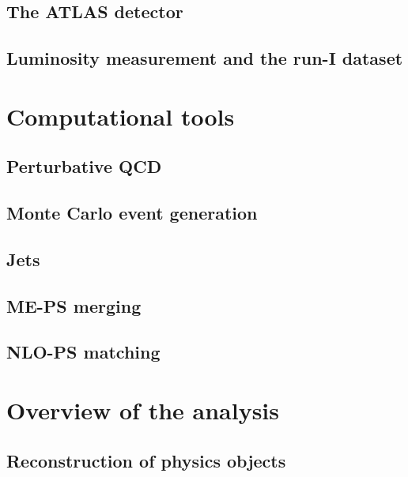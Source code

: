 \documentclass[hyper,linkcolor=blue]{mythesis}
\begin{document}
\begin{mainmatter}
    \section{The ATLAS detector}
      \label{sec:atlas}
      
    \section{Luminosity measurement and the run-I dataset}
      \label{sec:dataset}
      

  \chapter{Computational tools}
    \label{chap:tools}
    
    \section{Perturbative QCD}
      \label{sec:qcd}
      
    \section{Monte Carlo event generation}
      \label{sec:mc}
      
    \section{Jets}
      \label{sec:jets}
      
    \section{ME-PS merging}
      \label{sec:merging}
      
    \section{NLO-PS matching}
      \label{sec:matching}
      
  
  \chapter{Overview of the \HWW analysis}
    \label{chap:selection}
    
    \section{Reconstruction of physics objects}
      \label{sec:objects}
      

\end{mainmatter}
\end{document}
